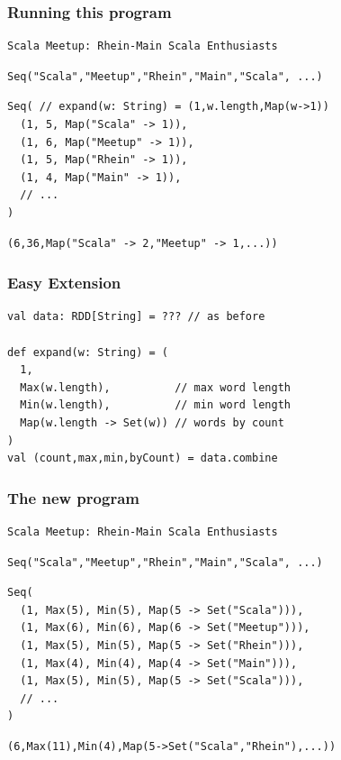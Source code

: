 \documentclass{beamer}
\begin{document}
\begin{frame}[fragile]
  \frametitle{Running this program}
\begin{verbatim}
Scala Meetup: Rhein-Main Scala Enthusiasts
\end{verbatim}
\begin{verbatim}
Seq("Scala","Meetup","Rhein","Main","Scala", ...)
\end{verbatim}
\begin{verbatim}
Seq( // expand(w: String) = (1,w.length,Map(w->1))
  (1, 5, Map("Scala" -> 1)),
  (1, 6, Map("Meetup" -> 1)),
  (1, 5, Map("Rhein" -> 1)),
  (1, 4, Map("Main" -> 1)),
  // ...
)
\end{verbatim}
\begin{verbatim}
(6,36,Map("Scala" -> 2,"Meetup" -> 1,...))
\end{verbatim}
\end{frame}

\begin{frame}[fragile]
  \frametitle{Easy Extension}
\begin{verbatim}
val data: RDD[String] = ??? // as before

def expand(w: String) = (
  1,
  Max(w.length),          // max word length
  Min(w.length),          // min word length
  Map(w.length -> Set(w)) // words by count
)
val (count,max,min,byCount) = data.combine
\end{verbatim}
\end{frame}

\begin{frame}[fragile]
  \frametitle{The new program}
\begin{verbatim}
Scala Meetup: Rhein-Main Scala Enthusiasts
\end{verbatim}
\begin{verbatim}
Seq("Scala","Meetup","Rhein","Main","Scala", ...)
\end{verbatim}
\begin{verbatim}
Seq(
  (1, Max(5), Min(5), Map(5 -> Set("Scala"))),
  (1, Max(6), Min(6), Map(6 -> Set("Meetup"))),
  (1, Max(5), Min(5), Map(5 -> Set("Rhein"))),
  (1, Max(4), Min(4), Map(4 -> Set("Main"))),
  (1, Max(5), Min(5), Map(5 -> Set("Scala"))),
  // ...
)
\end{verbatim}
\begin{verbatim}
(6,Max(11),Min(4),Map(5->Set("Scala","Rhein"),...))
\end{verbatim}
\end{frame}
\end{document}
